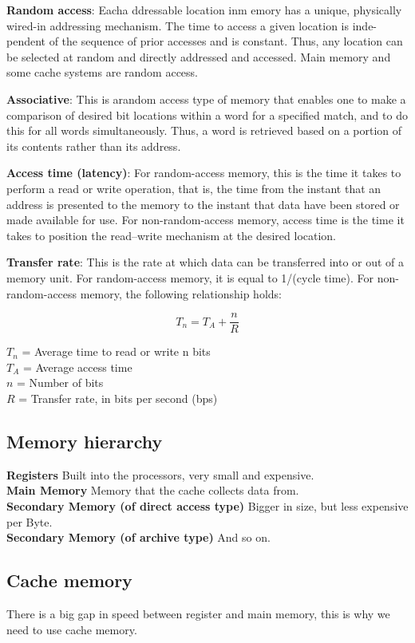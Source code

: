 \documentclass[titlepage, a4paper]{article}
\begin{document}
\textbf{Random access}: Eacha ddressable location inm emory has a unique, physically wired-in addressing mechanism. The time to access a given location is inde- pendent of the sequence of prior accesses and is constant. Thus, any location can be selected at random and directly addressed and accessed. Main memory and some cache systems are random access.

\textbf{Associative}: This is arandom access type of memory that enables one to make a comparison of desired bit locations within a word for a specified match, and to do this for all words simultaneously. Thus, a word is retrieved based on a portion of its contents rather than its address.

\textbf{Access time (latency)}: For random-access memory, this is the time it takes to perform a read or write operation, that is, the time from the instant that an address is presented to the memory to the instant that data have been stored or made available for use. For non-random-access memory, access time is the time it takes to position the read–write mechanism at the desired location.

\textbf{Transfer rate}: This is the rate at which data can be transferred into or out of a memory unit. For random-access memory, it is equal to 1/(cycle time).
For non-random-access memory, the following relationship holds:

$$T_n = T_A + \frac{n}{R}$$

$T_n$ = Average time to read or write n bits \\
$T_A$ = Average access time \\
$n$ = Number of bits \\
$R$ = Transfer rate, in bits per second (bps) \\

\subsection{Memory hierarchy}
\textbf{Registers} Built into the processors, very small and expensive. \\
\textbf{Main Memory} Memory that the cache collects data from. \\
\textbf{Secondary Memory (of direct access type)} Bigger in size, but less expensive per Byte. \\
\textbf{Secondary Memory (of archive type)} And so on. \\



\subsection{Cache memory}
There is a big gap in speed between register and main memory, this is why we need to use cache memory.
\end{document}
